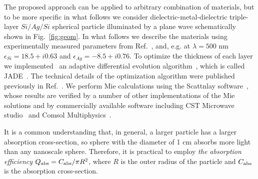 \documentclass[aps,prl,twocolumn,showpacs,superscriptaddress,groupedaddress]{revtex4-1}  %
\begin{document}
The proposed approach can be applied to arbitrary combination of
materials, but to be more specific in what follows we consider
dielectric-metal-dielectric triple-layer $Si/Ag/Si$ spherical particle
illuminated by a plane wave schematically shown in
Fig.~\ref{fig:geom}. In what follows we describe the materials using
experimentally measured parameters from Ref.~\cite{palik-1997}, and,
e.g. at $\lambda = 500$ nm $\epsilon_{Si} = 18.5 + i0.63$ and
$\epsilon_{Ag} = -8.5 + i0.76$.  To optimize the thickness of each
layer we implemented~\cite{JADE-web} an adaptive differential
evolution algorithm~\cite{Storn-DE-first-1997}, which is called
JADE~\cite{Jingqiao-JADE-2009}.  The technical details of the
optimization algorithm were published previously in
Ref.~\cite{Ladutenko-2014}. We perform Mie calculations using the
Scattnlay software~\cite{Pena-scattnlay-2009,Scattnlay-web}, whose
results are verified by a number of other implementations of the Mie
solutions and by commercially available software including CST
Microwave studio~\cite{CST-web} and Comsol
Multiphysics~\cite{Comsol-web}.

It is a common understanding that, in general, a larger particle has a
larger absorption cross-section, so sphere with the diameter of 1 cm
absorbs more light than any nanoscale sphere. Therefore, it is
practical to employ {\em the absorption efficiency} $Q_{\rm
  abs}=C_{\rm abs}/\pi R^2$, where $R$ is the outer radius of the
particle and $C_{\rm abs}$ is the absorption cross-section.
\end{document}
